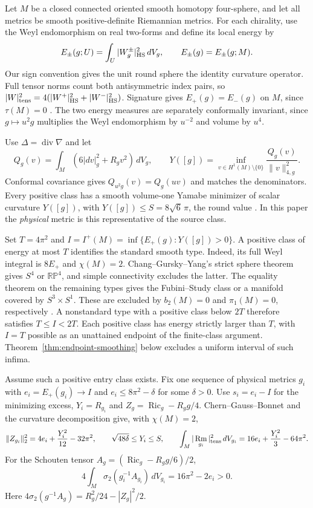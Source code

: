 \documentclass[11pt,letterpaper]{article}
\numberwithin{equation}{section}
\theoremstyle{remark}
\DeclareMathOperator{\Ric}{Ric}
\DeclareMathOperator{\Rm}{Rm}
\begin{document}
Let \(M\) be a closed connected oriented smooth homotopy four-sphere,
and let all metrics be smooth positive-definite Riemannian metrics.
For each chirality, use the Weyl endomorphism on real two-forms and
define its local energy by
\[
 E_\pm(g;U)=\int_U |W^\pm_g|_{\rm HS}^2\,dV_g,\qquad
 E_\pm(g)=E_\pm(g;M).
\]
Our sign convention gives the unit round sphere the identity
curvature operator. Full tensor norms count both antisymmetric
index pairs, so
\(\lvert W\rvert_{\rm tens}^2=4(\lvert W^+\rvert_{\rm HS}^2+
\lvert W^-\rvert_{\rm HS}^2)\).
Signature gives \(E_+(g)=E_-(g)\) on \(M\), since \(\tau(M)=0\)
\cite{Hirzebruch1971Signature}. The two energy measures are separately
conformally invariant, since \(g\mapsto u^2g\) multiplies the Weyl
endomorphism by \(u^{-2}\) and volume by \(u^4\).

Use \(\Delta=\operatorname{div}\nabla\) and let
\[
 Q_g(v)=\int_M(6|dv|_g^2+R_gv^2)\,dV_g,\qquad
 Y([g])=\inf_{v\in H^1(M)\setminus\{0\}}\frac{Q_g(v)}{\|v\|_{4,g}^2}.
\]
Conformal covariance gives \(Q_{u^2g}(v)=Q_g(uv)\) and matches the
denominators. Every positive class has a smooth volume-one Yamabe
minimizer of scalar curvature \(Y([g])\), with \(Y([g])\le
S=8\sqrt6\,\pi\), the round value
\cite[\S\S2--3]{LeeParker1987Yamabe}\cite[Theorem 2]{Schoen1984Yamabe}.
In this paper the \emph{physical} metric is this representative of
the source class.

Set \(T=4\pi^2\) and \(I=I^+(M)=\inf\{E_+(g):Y([g])>0\}\).
A positive class of energy at most \(T\) identifies the standard
smooth type. Indeed, its full Weyl integral is \(8E_+\) and
\(\chi(M)=2\). Chang--Gursky--Yang's strict sphere theorem
gives \(S^4\) or \(\mathbb{RP}^4\), and simple connectivity excludes
the latter. The equality theorem on the remaining types gives the
Fubini--Study class or a manifold covered by \(S^3\times S^1\).
These are excluded by \(b_2(M)=0\) and \(\pi_1(M)=0\),
respectively \cite[Theorems A and B and Remark 2]{ChangGurskyYang2003}.
A nonstandard type with a positive class below \(2T\) therefore
satisfies \(T\le I<2T\). Each positive class has energy strictly
larger than \(T\), with \(I=T\) possible as an unattained endpoint
of the finite-class argument. Theorem~\ref{thm:endpoint-smoothing}
below excludes a uniform interval of such infima.

Assume such a positive entry class exists. Fix one sequence of
physical metrics \(g_i\) with \(e_i=E_+(g_i)\to I\) and
\(e_i\le 8\pi^2-\delta\) for some \(\delta>0\).
Use \(s_i=e_i-I\) for the minimizing excess, \(Y_i=R_{g_i}\) and
\(Z_g=\Ric_g-R_gg/4\). Chern--Gauss--Bonnet and the curvature
decomposition give, with \(\chi(M)=2\),
\begin{equation}\label{eq:budgets}
 \|Z_{g_i}\|_2^2=4e_i+\frac{Y_i^2}{12}-32\pi^2,\qquad
 \sqrt{48\delta}\le Y_i\le S,\qquad
 \int_M |\Rm_{g_i}|_{\rm tens}^2\,dV_{g_i}
   =16e_i+\frac{Y_i^2}{3}-64\pi^2 .
\end{equation}
For the Schouten tensor \(A_g=(\Ric_g-R_gg/6)/2\),
\begin{equation}\label{eq:schouten}
 4\int_M\sigma_2(g_i^{-1}A_{g_i})\,dV_{g_i}=16\pi^2-2e_i>0 .
\end{equation}
Here \(4\sigma_2(g^{-1}A_g)=R_g^2/24-|Z_g|^2/2\).
\end{document}
